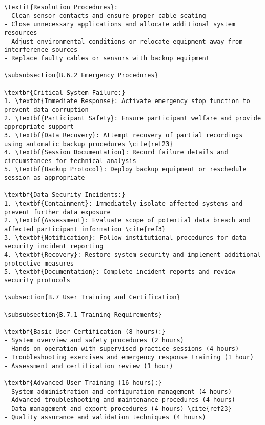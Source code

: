 \begin{verbatim}
\textit{Resolution Procedures}:
- Clean sensor contacts and ensure proper cable seating
- Close unnecessary applications and allocate additional system resources
- Adjust environmental conditions or relocate equipment away from interference sources
- Replace faulty cables or sensors with backup equipment

\subsubsection{B.6.2 Emergency Procedures}

\textbf{Critical System Failure:}
1. \textbf{Immediate Response}: Activate emergency stop function to prevent data corruption
2. \textbf{Participant Safety}: Ensure participant welfare and provide appropriate support
3. \textbf{Data Recovery}: Attempt recovery of partial recordings using automatic backup procedures \cite{ref23}
4. \textbf{Session Documentation}: Record failure details and circumstances for technical analysis
5. \textbf{Backup Protocol}: Deploy backup equipment or reschedule session as appropriate

\textbf{Data Security Incidents:}
1. \textbf{Containment}: Immediately isolate affected systems and prevent further data exposure
2. \textbf{Assessment}: Evaluate scope of potential data breach and affected participant information \cite{ref3}
3. \textbf{Notification}: Follow institutional procedures for data security incident reporting
4. \textbf{Recovery}: Restore system security and implement additional protective measures
5. \textbf{Documentation}: Complete incident reports and review security protocols

\subsection{B.7 User Training and Certification}

\subsubsection{B.7.1 Training Requirements}

\textbf{Basic User Certification (8 hours):}
- System overview and safety procedures (2 hours)
- Hands-on operation with supervised practice sessions (4 hours)
- Troubleshooting exercises and emergency response training (1 hour)
- Assessment and certification review (1 hour)

\textbf{Advanced User Training (16 hours):}
- System administration and configuration management (4 hours)
- Advanced troubleshooting and maintenance procedures (4 hours)
- Data management and export procedures (4 hours) \cite{ref23}
- Quality assurance and validation techniques (4 hours)


\end{verbatim}
